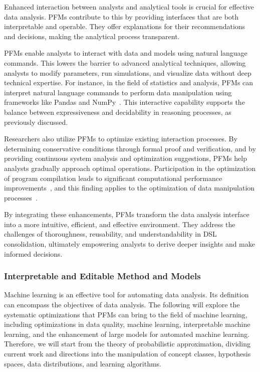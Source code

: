 Enhanced interaction between analysts and analytical tools is crucial for effective data analysis. PFMs contribute to this by providing interfaces that are both interpretable and operable. They offer explanations for their recommendations and decisions, making the analytical process transparent.

PFMs enable analysts to interact with data and models using natural language commands. This lowers the barrier to advanced analytical techniques, allowing analysts to modify parameters, run simulations, and visualize data without deep technical expertise. For instance, in the field of statistics and analysis, PFMs can interpret natural language commands to perform data manipulation using frameworks like Pandas and NumPy~\cite{lai2023ds}. This interactive capability supports the balance between expressiveness and decidability in reasoning processes, as previously discussed.

Researchers also utilize PFMs to optimize existing interaction processes. By determining conservative conditions through formal proof and verification, and by providing continuous system analysis and optimization suggestions, PFMs help analysts gradually approach optimal operations. Participation in the optimization of program compilation leads to significant computational performance improvements~\cite{cummins2023large, cummins2024meta}, and this finding applies to the optimization of data manipulation processes~\cite{li2024can}.

By integrating these enhancements, PFMs transform the data analysis interface into a more intuitive, efficient, and effective environment. They address the challenges of thoroughness, reusability, and understandability in DSL consolidation, ultimately empowering analysts to derive deeper insights and make informed decisions.



\subsubsection{Interpretable and Editable Method and Models}\label{sec:editability}

Machine learning is an effective tool for automating data analysis. Its definition can encompass the objectives of data analysis. The following will explore the systematic optimizations that PFMs can bring to the field of machine learning, including optimizations in data quality, machine learning, interpretable machine learning, and the enhancement of large models for automated machine learning. Therefore, we will start from the theory of probabilistic approximation, dividing current work and directions into the manipulation of concept classes, hypothesis spaces, data distributions, and learning algorithms.

